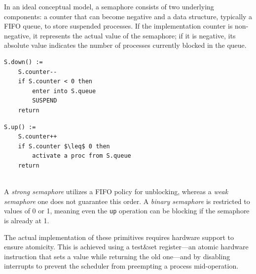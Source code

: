 In an ideal conceptual model, a semaphore consists of two underlying components: a counter that can become negative and a data structure, typically a FIFO queue, to store suspended processes. If the implementation counter is non-negative, it represents the actual value of the semaphore; if it is negative, its absolute value indicates the number of processes currently blocked in the queue. 

\begin{minipage}{\textwidth}
\begin{minipage}{0.45\textwidth}
\begin{lstlisting}[mathescape]
S.down() :=
    S.counter--
    if S.counter < 0 then
        enter into S.queue
        SUSPEND
    return
\end{lstlisting}
\end{minipage}
\hfill
\begin{minipage}{0.45\textwidth}
\begin{lstlisting}[mathescape]
S.up() :=
    S.counter++
    if S.counter $\leq$ 0 then
        activate a proc from S.queue
    return
\end{lstlisting}
\end{minipage}
\end{minipage}\\

A \textit{strong semaphore} utilizes a FIFO policy for unblocking, whereas a \textit{weak semaphore} one does not guarantee this order. A \textit{binary semaphore} is restricted to values of 0 or 1, meaning even the \texttt{up} operation can be blocking if the semaphore is already at 1.

The actual implementation of these primitives requires hardware support to ensure atomicity. This is achieved using a test\&set register—an atomic hardware instruction that sets a value while returning the old one—and by disabling interrupts to prevent the scheduler from preempting a process mid-operation. 

